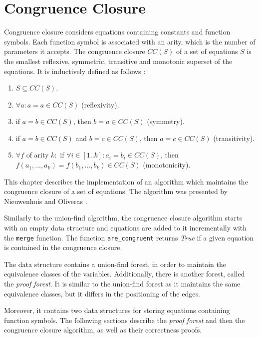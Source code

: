 
\chapter{Congruence Closure} \label{chapter:congruence_closure}

Congruence closure considers equations containing constants and function symbols. Each function symbol is associated with an arity, which is the number of parameters it accepts. The congruence closure $CC(S)$ of a set of equations $S$ is the smallest reflexive, symmetric, transitive and monotonic superset of the equations. It is inductively defined as follows \cite{congruenceclosure-ac}:

\begin{enumerate}[label=(\roman*)]
\itemsep0em
    \item $S \subseteq CC(S)$.
    \item $\forall a: a = a \in CC(S)$ (reflexivity).
    \item if $a = b \in CC(S)$, then $b = a \in CC(S)$ (symmetry).
    \item if $a = b \in CC(S)$ and $b = c \in CC(S)$, then $a = c \in CC(S)$ (transitivity).
    \item $\forall f$ of arity $k :$ if $\forall i \in [1..k]: a_i = b_i \in CC(S)$, then $f(a_1, ..., a_k) = f(b_1,..., b_k) \in CC(S)$ (monotonicity).
\end{enumerate}

This chapter describes the implementation of an algorithm which maintains the congruence closure of a set of equations.
The algorithm was presented by Nieuwenhuis and Oliveras \cite{Nieuwenhuis}.

Similarly to the union-find algorithm, the congruence closure algorithm starts with an empty data structure and equations are added to it incrementally with the \lstinline|merge| function. The function \lstinline|are_congruent| returns \emph{True} if a given equation is contained in the congruence closure.

The data structure contains a union-find forest, in order to maintain the equivalence classes of the variables. Additionally, there is another forest, called the \emph{proof forest}. It is similar to the union-find forest as it maintains the same equivalence classes, but it differs in the positioning of the edges.

Moreover, it contains two data structures for storing equations containing function symbols. The following sections describe the \emph{proof forest} and then the congruence closure algorithm, as well as their correctness proofs.

